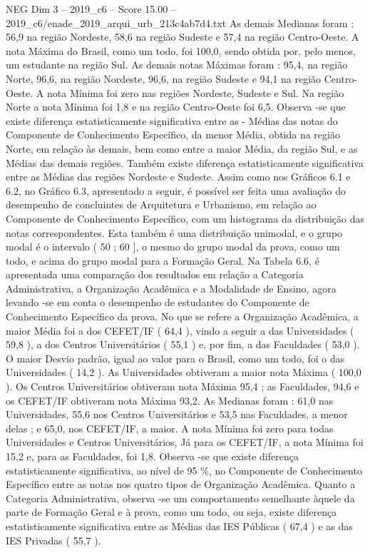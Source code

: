 \begin{textsample}{NEG Dim 3 – 2019\_c6 – Score 15.00 – 2019\_c6/enade\_2019\_arqui\_urb\_213c4ab7d4.txt}
As demais Medianas foram : 56,9 na região Nordeste, 58,6 na região Sudeste e 57,4 na região Centro-Oeste.
A nota Máxima do Brasil, como um todo, foi 100,0, sendo obtida por, pelo menos, um estudante na região Sul.
As demais notas Máximas foram : 95,4, na região Norte, 96,6, na região Nordeste, 96,6, na região Sudeste e 94,1 na região Centro-Oeste.
A nota Mínima foi zero nas regiões Nordeste, Sudeste e Sul.
Na região Norte a nota Mínima foi 1,8 e na região Centro-Oeste foi 6,5.
Observa -se que existe diferença estatisticamente significativa entre as - Médias das notas do Componente de Conhecimento Específico, da menor Média, obtida na região Norte, em relação às demais, bem como entre a maior Média, da região Sul, e as Médias das demais regiões.
Também existe diferença estatisticamente significativa entre as Médias das regiões Nordeste e Sudeste.
Assim como nos Gráficos 6.1 e 6.2, no Gráfico 6.3, apresentado a seguir, é possível ser feita uma avaliação do desempenho de concluintes de Arquitetura e Urbanismo, em relação ao Componente de Conhecimento Específico, com um histograma da distribuição das notas correspondentes.
Esta também é uma distribuição unimodal, e o grupo modal é o intervalo ( 50 ; 60 ], o mesmo do grupo modal da prova, como um todo, e acima do grupo modal para a Formação Geral.
Na Tabela 6.6, é apresentada uma comparação dos resultados em relação a Categoria Administrativa, a Organização Acadêmica e a Modalidade de Ensino, agora levando -se em conta o desempenho de estudantes do Componente de Conhecimento Específico da prova.
No que se refere a Organização Acadêmica, a maior Média foi a dos CEFET/IF ( 64,4 ), vindo a seguir a das Universidades ( 59,8 ), a dos Centros Universitários ( 55,1 ) e, por fim, a das Faculdades ( 53,0 ).
O maior Desvio padrão, igual ao valor para o Brasil, como um todo, foi o das Universidades ( 14,2 ).
As Universidades obtiveram a maior nota Máxima ( 100,0 ).
Os Centros Universitários obtiveram nota Máxima 95,4 ; as Faculdades, 94,6 e os CEFET/IF obtiveram nota Máxima 93,2.
As Medianas foram : 61,0 nas Universidades, 55,6 nos Centros Universitários e 53,5 nas Faculdades, a menor delas ; e 65,0, nos CEFET/IF, a maior.
A nota Mínima foi zero para todas Universidades e Centros Universitários, Já para os CEFET/IF, a nota Mínima foi 15,2 e, para as Faculdades, foi 1,8.
Observa -se que existe diferença estatisticamente significativa, ao nível de 95 \%, no Componente de Conhecimento Específico entre as notas nos quatro tipos de Organização Acadêmica.
Quanto a Categoria Administrativa, observa -se um comportamento semelhante àquele da parte de Formação Geral e à prova, como um todo, ou seja, existe diferença estatisticamente significativa entre as Médias das IES Públicas ( 67,4 ) e as das IES Privadas ( 55,7 ).

\end{textsample}
